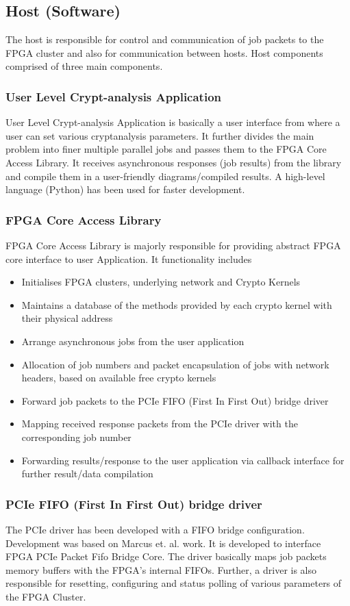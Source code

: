 \documentclass[10pt, conference, compsocconf]{IEEEtran}
\begin{document}
\subsection{Host (Software)}
The host is responsible for control and communication of job packets to the FPGA cluster and also for communication between hosts. Host components comprised of three main components.

\subsubsection{User Level Crypt-analysis Application}
User Level Crypt-analysis Application is basically a user interface from where a user can set various cryptanalysis parameters. It further divides the main problem into finer multiple parallel jobs and passes them to the FPGA Core Access Library. It receives asynchronous responses (job results) from the library and compile them in a user-friendly diagrams/compiled results. A high-level language (Python) has been used for faster development.

\subsubsection{FPGA Core Access Library}
FPGA Core Access Library is majorly responsible for providing abstract FPGA core interface to user Application. It functionality includes
\begin{itemize}
  \item Initialises FPGA clusters, underlying network and Crypto Kernels
  \item Maintains a database of the methods provided by each crypto kernel with their physical address
  \item Arrange asynchronous jobs from the user application
  \item Allocation of job numbers and packet encapsulation of jobs with network headers, based on available free crypto kernels
  \item Forward job packets to the PCIe FIFO (First In First Out) bridge driver
  \item Mapping received response packets from the PCIe driver with the corresponding job number
  \item Forwarding results/response to the user application via callback interface for further result/data compilation
\end{itemize}
 
\subsubsection{PCIe FIFO (First In First Out) bridge driver}
The PCIe driver has been developed with a FIFO bridge configuration. Development was based on Marcus et. al.\cite{marcus2011mprace} work. It is developed to interface FPGA PCIe Packet Fifo Bridge Core. The driver basically maps job packets memory buffers with the FPGA's internal FIFOs. Further, a driver is also responsible for resetting, configuring and status polling of various parameters of the FPGA Cluster. 
  
\end{document}
